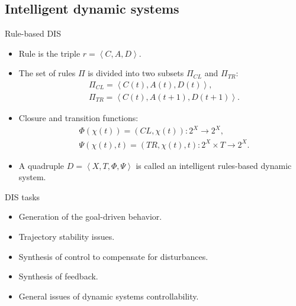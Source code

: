 \documentclass[default]{beamer}
\begin{document}
	\subsection{Intelligent dynamic systems}
	\begin{frame}{Rule-based DIS}
		\begin{itemize}
			\item Rule is the triple $r=\left\langle C,A,D \right\rangle$.
			\item The set of rules $\Pi $ is divided into two subsets ${{\Pi }_{CL}}$  and ${{\Pi }_{TR}}$:
			\begin{align*}
			& {{\Pi }_{CL}}=\left\langle C\left( t \right),A\left( t \right),D\left( t \right) \right\rangle , \\ 
			& {{\Pi }_{TR}}=\left\langle C\left( t \right),A\left( t+1 \right),D\left( t+1 \right) \right\rangle .
			\end{align*}
			\item Closure and transition functions:
			\begin{align*}
			& \Phi \left( \chi \left( t \right) \right)=\left( CL,\chi \left( t \right) \right):{{2}^{X}}\to {{2}^{X}},\\
			& \Psi \left( \chi \left( t \right),t \right)=\left( TR,\chi \left( t \right),t \right):{{2}^{X}}\times T\to {{2}^{X}}.
			\end{align*}
			\item A quadruple $D=\left\langle X,T,\Phi ,\Psi  \right\rangle $ is called an intelligent rules-based dynamic system.
		\end{itemize}
		
		\vspace{-5pt}
		\nocite{*}
		\printbibliography[keyword={dis}, resetnumbers=true]
	\end{frame}
	\begin{frame}{DIS tasks}
		\begin{itemize}
			\item Generation of the goal-driven behavior.
			\item Trajectory stability issues.
			\item Synthesis of control to compensate for disturbances.
			\item Synthesis of feedback.
			\item General issues of dynamic systems controllability.
		\end{itemize}
		
		\par\bigskip
		\nocite{*}
		\printbibliography[keyword={dis}, resetnumbers=true]
	\end{frame}
\end{document}
